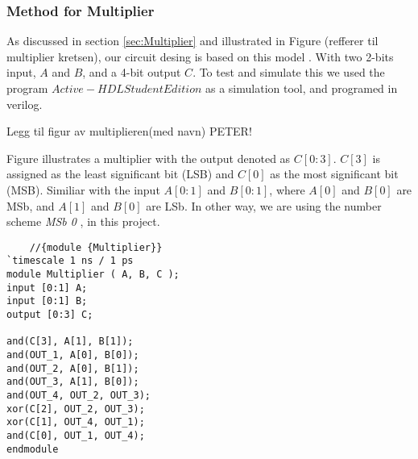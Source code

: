 \subsubsection{Method for Multiplier} \label{Method-Multiplier}
As discussed in section \ref{sec:Multiplier} and illustrated in Figure (refferer til multiplier kretsen), our circuit desing is based on this model . With two 2-bits input, $A$ and $B$, and a 4-bit output $C$. To test and simulate this we used the program $Active-HDL Student Edition$ as a simulation tool, and programed in verilog. 

Legg til figur av multiplieren(med navn) PETER!


Figure illustrates a multiplier with the output denoted as $C[0:3]$. $C[3]$ is assigned as the least significant bit (LSB) and $C[0]$ as the most significant bit (MSB). Similiar with the input $A[0:1]$ and $B[0:1]$, where $A[0] $ and $B[0]$ are MSb, and $A[1]$ and $B[0]$ are LSb. In other way, we are using the number scheme \emph{MSb 0} \cite{wikipediacontributors_2023_bit}, in this project.

\begin{lstlisting}
    //{module {Multiplier}}	
`timescale 1 ns / 1 ps
module Multiplier ( A, B, C );
input [0:1] A;
input [0:1] B;
output [0:3] C;

and(C[3], A[1], B[1]);
and(OUT_1, A[0], B[0]);
and(OUT_2, A[0], B[1]);
and(OUT_3, A[1], B[0]);
and(OUT_4, OUT_2, OUT_3);
xor(C[2], OUT_2, OUT_3); 
xor(C[1], OUT_4, OUT_1);
and(C[0], OUT_1, OUT_4);
endmodule
\end{lstlisting}
